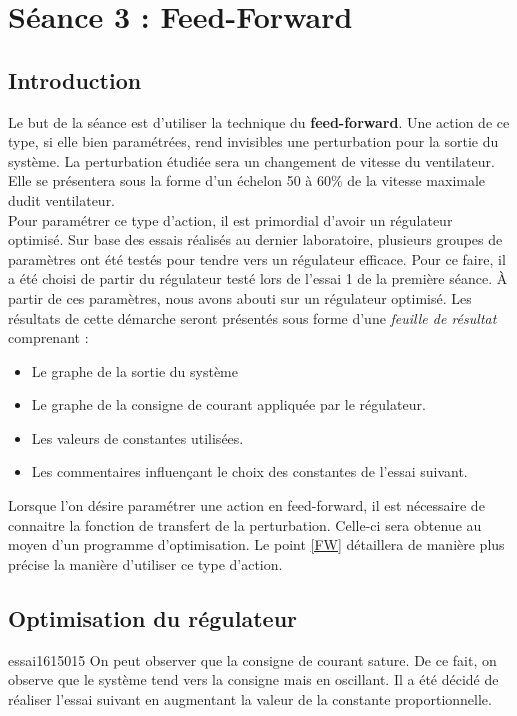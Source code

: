 \section{Séance 3 : Feed-Forward}
\subsection{Introduction}
Le but de la séance est d'utiliser la technique du \textbf{feed-forward}. Une action de ce type, si elle bien paramétrées, rend invisibles une perturbation pour la sortie du système. La perturbation étudiée sera un changement de vitesse du ventilateur. Elle se présentera sous la forme d'un échelon 50 à 60\% de la vitesse maximale dudit ventilateur.\\

Pour paramétrer ce type d'action, il est primordial d'avoir un régulateur optimisé. Sur base des essais réalisés au dernier laboratoire, plusieurs groupes de paramètres ont été testés pour tendre vers un régulateur efficace. Pour ce faire, il a été choisi de partir du régulateur testé lors de l'essai 1 de la première séance. À partir de ces paramètres, nous avons abouti sur un régulateur optimisé. Les résultats de cette démarche seront présentés sous forme d'une \textit{feuille de résultat} comprenant :
\begin{itemize}
\item Le graphe de la sortie du système 
\item Le graphe de la consigne de courant appliquée par le régulateur.
\item Les valeurs de constantes utilisées.
\item Les commentaires influençant le choix des constantes de l'essai suivant.
\end{itemize}

Lorsque l'on désire paramétrer une action en feed-forward, il est nécessaire de connaitre la fonction de transfert de la perturbation. Celle-ci sera obtenue au moyen d'un programme d'optimisation. Le point \ref{FW} détaillera de manière plus précise la manière d'utiliser ce type d'action.\\ 


\subsection{Optimisation du régulateur}
\begin{optibox}{essai1}{6}{150}{15}
On peut observer que la consigne de courant sature. De ce fait, on observe que le système tend vers la consigne mais en oscillant.  Il a été décidé de réaliser l'essai suivant en augmentant la valeur de la constante proportionnelle.
\\\hline
\end{optibox}

